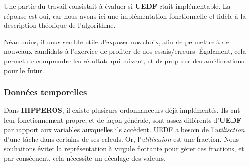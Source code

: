 
	Une partie du travail consistait à évaluer si \textbf{UEDF} était implémentable. 
	La réponse est oui, car nous avons ici une implémentation fonctionnelle et fidèle à la description 
	théorique de l'algorithme. \newline
	
	Néanmoins, il nous semble utile d'exposer nos choix, afin de permettre à de nouveaux candidats 
	à l'exercice de profiter de nos essais/erreurs. Également, cela permet de comprendre les 
	résultats qui suivent, et de proposer des améliorations pour le futur.

	\subsubsection{Données temporelles}
	
		Dans \textbf{HIPPEROS}, il existe plusieurs ordonnanceurs déjà implémentés. 
		Ils ont leur fonctionnement propre, et de façon générale, sont assez différents d'\textbf{UEDF} par 
		rapport aux variables auxquelles ils accèdent. 
		UEDF a besoin de l'\textit{utilisation} d'une tâche dans certains de ses calculs. Or, l'\textit{utilisation} 
		est une fraction. Nous souhaitons éviter la représentation à virgule flottante 
		pour gérer ces fractions, et par conséquent, cela nécessite un décalage des valeurs.\newline
		 
